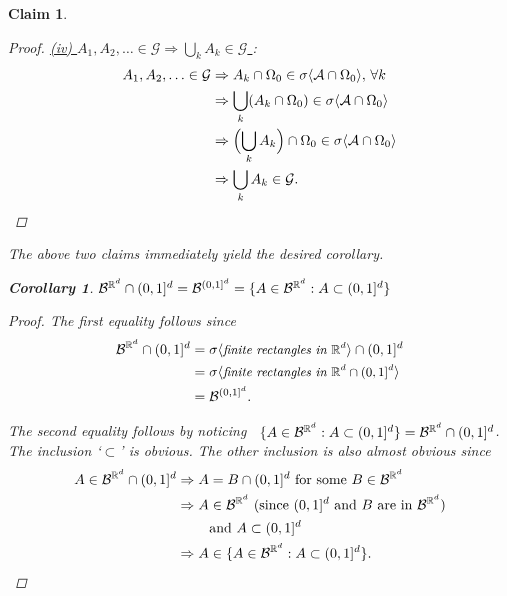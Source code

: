 \documentclass[10pt,letterpaper,twocolumn]{article}
\newtheorem{corollary}{Corollary}
\newtheorem{claim}{Claim}
\begin{document}
\begin{claim}
\begin{proof}
  \vspace{.2cm}
\noindent
\underline{(iv) $A_1,A_2,\ldots \in \mathcal G \Rightarrow \bigcup_k A_k\in \mathcal G$ }:
\begin{align*}
A_1,A_2,\ldots \in \mathcal G&\Rightarrow A_k\cap \Omega_0 \in \sigma\langle \mathcal A\cap \Omega_0\rangle,\,\forall k \\
&\Rightarrow  \bigcup_k (A_k\cap \Omega_0) \in\sigma\langle \mathcal A\cap \Omega_0\rangle \\
 &\Rightarrow  \Bigl(\bigcup_k A_k\Bigr)\cap \Omega_0 \in\sigma\langle \mathcal A\cap \Omega_0\rangle \\
&\Rightarrow  \bigcup_k A_k\in \mathcal G.
\end{align*}


\end{proof}



The above two claims immediately yield the desired corollary. 
\begin{corollary} $\mathcal B^{\Bbb R^d}\cap (0,1]^d =\mathcal B^{(0,1]^d} = \{ A\in\mathcal B^{\Bbb R^d}: A\subset (0,1]^d\}$
\end{corollary}
\begin{proof}
The first equality follows since 
\begin{align*}
\mathcal B^{\Bbb R^d}\cap (0,1]^d &= \sigma\langle \textit{\small finite rectangles in $\Bbb R^d$}\rangle \cap (0,1]^d \\
&= \sigma\langle \textit{\small finite rectangles in $\Bbb R^d \cap (0,1]^d$}\rangle  \\
&=\mathcal B^{(0,1]^d} .
\end{align*}


The second equality follows by noticing \mbox{ $ \{ A\in\mathcal B^{\Bbb R^d}: A\subset (0,1]^d\}=\mathcal B^{\Bbb R^d}\cap (0,1]^d$}. The inclusion `$\subset$' is obvious. The other inclusion is also almost obvious since
\begin{align*}
 A\in \mathcal B^{\Bbb R^d}\cap (0,1]^d&\Rightarrow \text{$A=B\cap (0,1]^d$ for some $B\in\mathcal B^{\Bbb R^d}$}\\
 &\Rightarrow \text{$A\in \mathcal B^{\Bbb R^d}$  (since $(0,1]^d$ and $ B$ are in $\mathcal B^{\Bbb R^d}$)}\\
 &\qquad\text{ and $A\subset (0,1]^d$  }\\
  &\Rightarrow  A \in \{ A\in\mathcal B^{\Bbb R^d}: A\subset (0,1]^d\}.
\end{align*}
\end{proof}


\end{claim}
\end{document}
